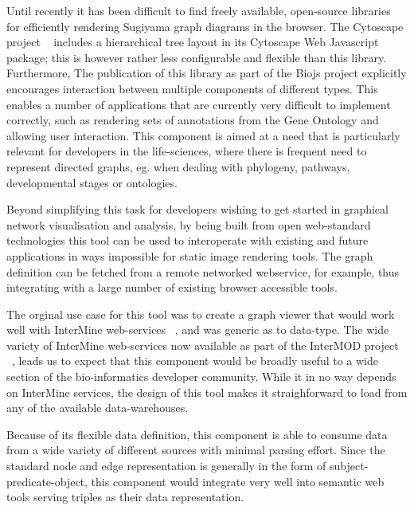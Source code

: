 \documentclass[10pt,a4paper,twocolumn]{article}
\begin{document}
Until recently it has been difficult to find freely available, open-source libraries for
efficiently rendering Sugiyama graph diagrams in the browser. The Cytoscape
project ~\cite{cytoscape} includes a hierarchical tree layout in its Cytoscape
Web Javascript package; this is however rather less configurable and flexible
than this library. Furthermore, The publication of
this library as part of the Biojs project explicitly encourages interaction
between multiple components of different types. This enables a number of applications that
are currently very difficult to implement correctly, such as rendering sets of
annotations from the Gene Ontology and allowing user interaction. This component is aimed at
a need that is particularly relevant for developers in the life-sciences, where
there is frequent need to represent directed graphs, eg.  when dealing with
phylogeny, pathways, developmental stages or ontologies.

Beyond simplifying this task for developers wishing to get started in graphical
network visualisation and analysis, by being built from open web-standard
technologies this tool can be used to interoperate with existing and future
applications in ways impossible for static image rendering tools. The graph
definition can be fetched from a remote networked webservice, for example, thus
integrating with a large number of existing browser accessible tools.

The orginal use case for this tool was to create a graph viewer that would work
well with InterMine web-services ~\cite{intermine}, and was generic as to data-type.  
The wide variety of InterMine web-services now available as part of the
InterMOD project ~\cite{intermod}, leads us to expect that this component would be
broadly useful to a wide section of the bio-informatics developer community.
While it in no way depends on InterMine services, the design of this tool makes
it straighforward to load from any of the available data-warehouses.

Because of
its flexible data definition, this component is able to consume data from a wide
variety of different sources with minimal parsing effort. Since the standard
node and edge representation is generally in the form of
subject-predicate-object, this component would integrate very well into semantic
web tools serving triples as their data representation.
\end{document}
